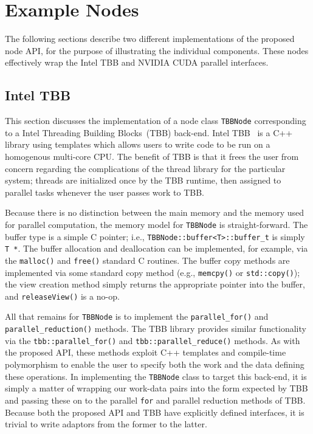 \documentclass[10pt,conference,letterpaper]{IEEEtran}
\begin{document}
\section{Example Nodes}

The following sections describe two different implementations of the proposed node API, for the purpose of illustrating the individual components. These nodes effectively wrap the Intel TBB and NVIDIA CUDA parallel interfaces.

\subsection{Intel TBB}

This section discusses the implementation of a node class \verb!TBBNode! corresponding to a Intel Threading Building Blocks~(TBB) back-end. Intel TBB~\cite{TBB} is a C++ library using templates which allows users to write code to be run on a homogenous multi-core CPU. The benefit of TBB is that it frees the user from concern regarding the complications of the thread library for the particular system; threads are initialized once by the TBB runtime, then assigned to parallel tasks whenever the user passes work to TBB.

Because there is no distinction between the main memory and the memory used for parallel computation, the memory model for \verb!TBBNode! is straight-forward. The buffer type is a simple C pointer; i.e., \verb!TBBNode::buffer<T>::buffer_t! is simply \verb!T *!. The buffer allocation and deallocation can be implemented, for example, via the \verb!malloc()! and \verb!free()! standard C routines. The buffer copy methods are implemented via some standard copy method (e.g., \verb!memcpy()! or \verb!std::copy()!); the view creation method simply returns the appropriate pointer into the buffer, and \verb!releaseView()! is a no-op.

All that remains for \verb!TBBNode! is to implement the \verb!parallel_for()! and \verb!parallel_reduction()! methods. The TBB library provides similar functionality via the \verb!tbb::parallel_for()! and \verb!tbb::parallel_reduce()! methods. As with the proposed API, these methods exploit C++ templates and compile-time polymorphism to enable the user to specify both the work and the data defining these operations. In implementing the \verb!TBBNode! class to target this back-end, it is simply a matter of wrapping our work-data pairs into the form expected by TBB and passing these on to the parallel \verb!for! and parallel reduction methods of TBB. Because both the proposed API and TBB have explicitly defined interfaces, it is trivial to write adaptors from the former to the latter.
\end{document}

